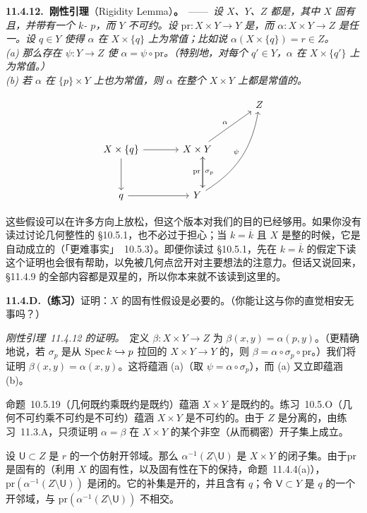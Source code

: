 \textbf{11.4.12.\ 刚性引理}（Rigidity Lemma）\textbf{。}\ ——\ \emph{设 $X$、$Y$、$Z$ 都是\trVariety，其中 $X$ 固有且\trGeometricallyIntegral，并带有一个 $k$-\trValuedPoint{} $p$，而 $Y$ 不可约。设 $\mathrm{pr}\colon X\times Y\to Y$ 是\trProjection，而 $\alpha\colon X\times Y\to Z$ 是任一\trMorphism。设 $q\in Y$ 使得 $\alpha$ 在 $X\times\{q\}$ 上为常值；比如说 $\alpha(X\times\{q\})=r\in Z$。}\\
\emph{(a) 那么存在\trMorphism{} $\psi\colon Y\to Z$ 使 $\alpha=\psi\circ\mathrm{pr}$。（特别地，对每个 $q'\in Y$，$\alpha$ 在 $X\times\{q'\}$ 上为常值。）}\\
\emph{(b) 若 $\alpha$ 在 $\{p\}\times Y$ 上也为常值，则 $\alpha$ 在整个 $X\times Y$ 上都是常值的。}

\[
\begin{tikzcd}[row sep=3em, column sep=3.6em]
& & Z \\
X\times\{q\} \ar[r] \ar[d] & X\times Y \ar[ur, "\alpha"] \ar[d, "\mathrm{pr}"', shift left=0.55em] \\
q \ar[r] & Y \ar[u, "\sigma_p"', shift right=0.55em] \ar[uur, bend right=24, "\psi"]
\end{tikzcd}
\]

这些假设可以在许多方向上放松，但这个版本对我们的目的已经够用。如果你没有读过讨论几何整性的 \S10.5.1，也不必过于担心；当 $k=\overline{k}$ 且 $X$ 是整的时候，它是自动成立的（「更难事实」~10.5.3）。即便你读过 \S10.5.1，先在 $k=\overline{k}$ 的假定下读这个证明也会很有帮助，以免被几何点岔开对主要想法的注意力。但话又说回来，\S11.4.9 的全部内容都是双星的，所以你本来就不该读到这里的。

\textbf{11.4.D.（练习）}\quad 证明：$X$ 的固有性假设是必要的。（你能让这与你的直觉相安无事吗？）

\emph{刚性引理~11.4.12 的证明。}\ 定义 $\beta\colon X\times Y\to Z$ 为 $\beta(x,y)=\alpha(p,y)$。（更精确地说，若 $\sigma_p$ 是从 $\operatorname{Spec} k\hookrightarrow p$ 拉回的 $X\times Y\to Y$ 的\trSection，则 $\beta=\alpha\circ\sigma_p\circ\mathrm{pr}$。）我们将证明 $\beta(x,y)=\alpha(x,y)$。这将蕴涵 (a)（取 $\psi=\alpha\circ\sigma_p$），而 (a) 又立即蕴涵 (b)。

命题~10.5.19（几何既约乘既约是既约）蕴涵 $X\times Y$ 是既约的。\mbox{练习~10.5.O}（几何不可约乘不可约是不可约）蕴涵 $X\times Y$ 是不可约的。由于 $Z$ 是分离的，由\mbox{练习~11.3.A}，只须证明 $\alpha=\beta$ 在 $X\times Y$ 的某个非空（从而稠密）开子集上成立。

设 $\mathsf{U}\subset Z$ 是 $r$ 的一个仿射开邻域。那么 $\alpha^{-1}(Z\setminus\mathsf{U})$ 是 $X\times Y$ 的闭子集。由于\trProjection $\mathrm{pr}$ 是固有的（利用 $X$ 的固有性，以及固有性在\trBaseChange{}下的保持，命题~11.4.4(a)），$\mathrm{pr}(\alpha^{-1}(Z\setminus\mathsf{U}))$ 是闭的。它的补集是开的，并且含有 $q$；令 $\mathsf{V}\subset Y$ 是 $q$ 的一个开邻域，与 $\mathrm{pr}(\alpha^{-1}(Z\setminus\mathsf{U}))$ 不相交。

